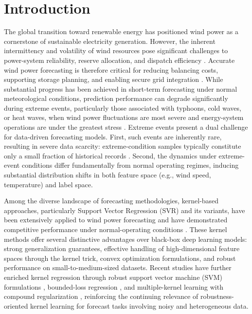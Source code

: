 \documentclass[a4paper]{cas-sc}
\begin{document}
\maketitle

\section{Introduction}

The global transition toward renewable energy has positioned wind power as a cornerstone of sustainable electricity generation. However, the inherent intermittency and volatility of wind resources pose significant challenges to power-system reliability, reserve allocation, and dispatch efficiency \citep{yuan2023conditional}. Accurate wind power forecasting is therefore critical for reducing balancing costs, supporting storage planning, and enabling secure grid integration \citep{yan2025economic, wang2025ensemble}. While substantial progress has been achieved in short-term forecasting under normal meteorological conditions, prediction performance can degrade significantly during extreme events, particularly those associated with typhoons, cold waves, or heat waves, when wind power fluctuations are most severe and energy-system operations are under the greatest stress \citep{wang2024scarcity, liu2024extreme, liu2025diffusion}.
Extreme events present a dual challenge for data-driven forecasting models. First, such events are inherently rare, resulting in severe data scarcity: extreme-condition samples typically constitute only a small fraction of historical records \citep{s41597-022-01696-6, wang2024scarcity}. Second, the dynamics under extreme-event conditions differ fundamentally from normal operating regimes, inducing substantial distribution shifts in both feature space (e.g., wind speed, temperature) and label space. 

Among the diverse landscape of forecasting methodologies, kernel-based approaches, particularly Support Vector Regression (SVR) and its variants, have been extensively applied to wind power forecasting and have demonstrated competitive performance under normal-operating conditions \citep{wang2019review, zeng2011svmwind, li2021cuckoo, yuan2022jellyfish}. These kernel methods offer several distinctive advantages over black-box deep learning models: strong generalization guarantees, effective handling of high-dimensional feature spaces through the kernel trick, convex optimization formulations, and robust performance on small-to-medium-sized datasets. Recent studies have further enriched kernel regression through robust support vector machine (SVM) formulations \citep{trafalis2006robust}, bounded-loss regression \citep{fu2023bounded}, and multiple-kernel learning with compound regularization \citep{jiang2021rlmkl}, reinforcing the continuing relevance of robustness-oriented kernel learning for forecast tasks involving noisy and heterogeneous data.
\end{document}
